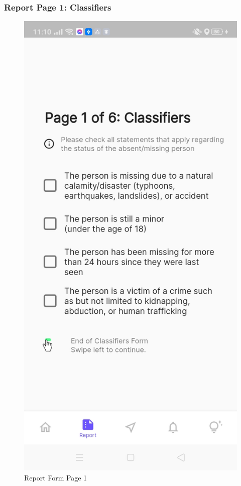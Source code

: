 \subsubsection{Report Page 1: Classifiers}
\begin{figure}[!h]
    \centering
    \begin{minipage}[c]{0.50\linewidth}
        \centering
        \includegraphics[scale=0.15]{figures/Chapter4/Main/p1.jpg}
        \caption{Report Form Page 1}
        \label{fig:p1}
    \end{minipage}
\end{figure}

